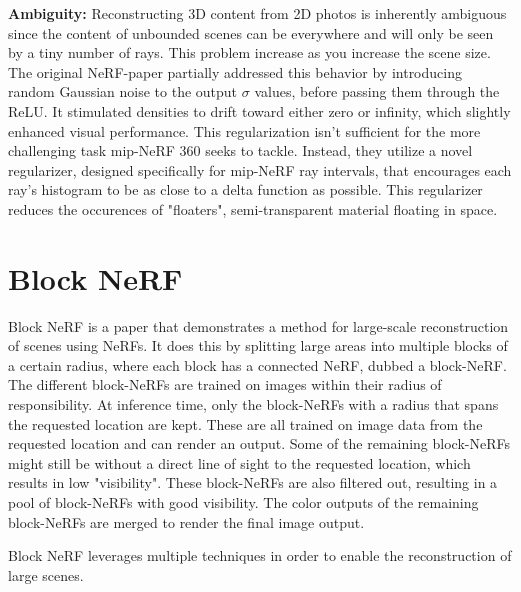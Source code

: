 \textbf{Ambiguity:}
Reconstructing 3D content from 2D photos is inherently ambiguous since the content of unbounded scenes can be everywhere and will only be seen by a tiny number of rays. This problem increase as you increase the scene size. The original NeRF-paper partially addressed this behavior by introducing random Gaussian noise to the output $\sigma$ values, before passing them through the ReLU. It stimulated densities to drift toward either zero or infinity, which slightly enhanced visual performance. This regularization isn't sufficient for the more challenging task mip-NeRF 360 seeks to tackle. Instead, they utilize a novel regularizer, designed specifically for mip-NeRF ray intervals, that encourages each ray's histogram to be as close to a delta function as possible. This regularizer reduces the occurences of "floaters", semi-transparent material floating in space.



\section{Block NeRF}
Block NeRF is a paper that demonstrates a method for large-scale reconstruction of scenes using NeRFs. It does this by splitting large areas into multiple blocks of a certain radius, where each block has a connected NeRF, dubbed a block-NeRF. The different block-NeRFs are trained on images within their radius of responsibility. At inference time, only the block-NeRFs with a radius that spans the requested location are kept. These are all trained on image data from the requested location and can render an output. Some of the remaining block-NeRFs might still be without a direct line of sight to the requested location, which results in low "visibility". These block-NeRFs are also filtered out, resulting in a pool of block-NeRFs with good visibility. The color outputs of the remaining block-NeRFs are merged to render the final image output.

Block NeRF leverages multiple techniques in order to enable the reconstruction of large scenes.


